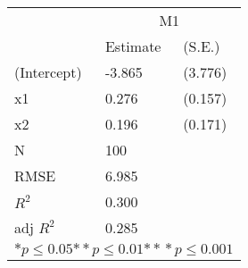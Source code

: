 \begin{tabular}{*{3}{l}}
\hline
                  & \multicolumn{2}{c}{M1}   \tabularnewline
                   &Estimate  &(S.E.)  \tabularnewline
 \hline
 \hline
   (Intercept)     &-3.865   &   (3.776) \tabularnewline
   x1              &0.276   &   (0.157) \tabularnewline
   x2              &0.196   &   (0.171) \tabularnewline
 \hline
 N                 &100       &        \tabularnewline
 RMSE             &6.985         & \tabularnewline
 $R^2$             &0.300         & \tabularnewline
 adj $R^2$         &0.285         & \tabularnewline
 \hline
\hline
 
 \multicolumn{3}{c}{${*  p}\le 0.05$${*\!\!*  p}\le 0.01$${*\!\!*\!\!*  p}\le 0.001$}\tabularnewline
 \end{tabular}